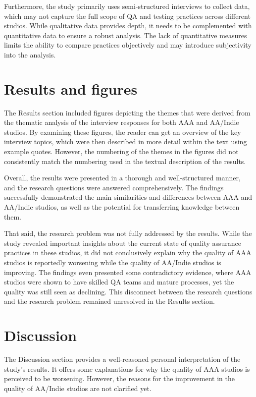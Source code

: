 \documentclass[conference]{IEEEtran}
\begin{document}
Furthermore, the study primarily uses semi-structured interviews to collect data, which may not capture the full scope of QA and testing practices across different studios. While qualitative data provides depth, it needs to be complemented with quantitative data to ensure a robust analysis. The lack of quantitative measures limits the ability to compare practices objectively and may introduce subjectivity into the analysis.

\section{Results and figures}
The Results section included figures depicting the themes that were derived from the thematic analysis of the interview responses for both AAA and AA/Indie studios. By examining these figures, the reader can get an overview of the key interview topics, which were then described in more detail within the text using example quotes. However, the numbering of the themes in the figures did not consistently match the numbering used in the textual description of the results.

Overall, the results were presented in a thorough and well-structured manner, and the research questions were answered comprehensively. The findings successfully demonstrated the main similarities and differences between AAA and AA/Indie studios, as well as the potential for transferring knowledge between them.

That said, the research problem was not fully addressed by the results. While the study revealed important insights about the current state of quality assurance practices in these studios, it did not conclusively explain why the quality of AAA studios is reportedly worsening while the quality of AA/Indie studios is improving. The findings even presented some contradictory evidence, where AAA studios were shown to have skilled QA teams and mature processes, yet the quality was still seen as declining. This disconnect between the research questions and the research problem remained unresolved in the Results section.


\section{Discussion}
The Discussion section provides a well-reasoned personal interpretation of the study's results. It offers some explanations for why the quality of AAA studios is perceived to be worsening. However, the reasons for the improvement in the quality of AA/Indie studios are not clarified yet.
\end{document}
